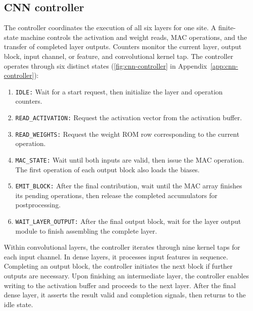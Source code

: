 \subsection{CNN controller}
The controller coordinates the execution of all six layers for one site. A finite-state machine controls the activation and weight reads, MAC operations, and the transfer of completed layer outputs. Counters monitor the current layer, output block, input channel, or feature, and convolutional kernel tap. The controller operates through six distinct states (\cref{fig:cnn-controller} in Appendix~\ref{app:cnn-controller}):
\begin{enumerate}
    \item \texttt{IDLE:} Wait for a start request, then initialize the layer and operation counters.
    \item \texttt{READ\_ACTIVATION:} Request the activation vector from the activation buffer.
    \item \texttt{READ\_WEIGHTS:} Request the weight ROM row corresponding to the current operation.
    \item \texttt{MAC\_STATE:} Wait until both inputs are valid, then issue the MAC operation. The first operation of each output block also loads the biases.
    \item \texttt{EMIT\_BLOCK:} After the final contribution, wait until the MAC array finishes its pending operations, then release the completed accumulators for postprocessing.
    \item \texttt{WAIT\_LAYER\_OUTPUT:} After the final output block, wait for the layer output module to finish assembling the complete layer.
\end{enumerate}

Within convolutional layers, the controller iterates through nine kernel taps for each input channel. In dense layers, it processes input features in sequence. Completing an output block, the controller initiates the next block if further outputs are necessary. Upon finishing an intermediate layer, the controller enables writing to the activation buffer and proceeds to the next layer. After the final dense layer, it asserts the result valid and completion signals, then returns to the idle state.
